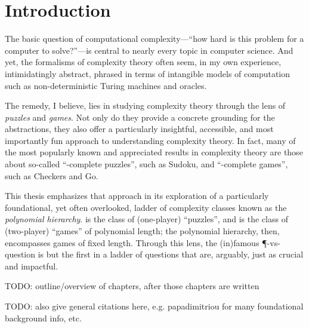 \chapter{Introduction}

The basic question of computational complexity---``how hard is this problem for
a computer to solve?''---is central to nearly every topic in computer science.
And yet, the formalisms of complexity theory often seem, in my own experience,
intimidatingly abstract, phrased in terms of intangible models of computation
such as non-deterministic Turing machines and oracles.

The remedy, I believe, lies in studying complexity theory through the lens of
\emph{puzzles} and \emph{games}.  Not only do they provide a concrete grounding
for the abstractions, they also offer a particularly insightful, accessible,
and most importantly fun approach to understanding complexity theory.  In fact,
many of the most popularly known and appreciated results in complexity theory
are those about so-called ``\NP-complete puzzles'', such as Sudoku, and
``\PSPACE-complete games'', such as Checkers and Go.

This thesis emphasizes that approach in its exploration of a particularly
foundational, yet often overlooked, ladder of complexity classes known as the
\emph{polynomial hierarchy}.  \NP{} is the class of (one-player) ``puzzles'',
and \PSPACE{} is the class of (two-player) ``games'' of polynomial length; the
polynomial hierarchy, then, encompasses games of fixed length.  Through this
lens, the (in)famous \P-vs-\NP{} question is but the first in a ladder of
questions that are, arguably, just as crucial and impactful.


TODO: outline/overview of chapters, after those chapters are written

TODO: also give general citations here, e.g. papadimitriou for many
foundational background info, etc.











